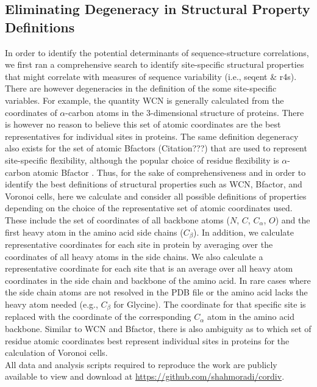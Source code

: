 \documentclass[12pt]{article}
\begin{document}
    \subsection*{Eliminating Degeneracy in Structural Property Definitions}
    In order to identify the potential determinants of sequence-structure correlations, we first ran a comprehensive search to identify site-specific structural properties that might correlate with measures of sequence variability (i.e., seqent \& r4s). There are however degeneracies in the definition of the some site-specific variables. For example, the quantity WCN is generally calculated from the coordinates of $\alpha$-carbon atoms in the 3-dimensional structure of proteins. There is however no reason to believe this set of atomic coordinates are the best representatives for individual sites in proteins. The same definition degeneracy also exists for the set of atomic Bfactors {\color{red}(Citation???)} that are used to represent site-specific flexibility, although the popular choice of residue flexibility is $\alpha$-carbon atomic Bfactor \citep{Halle2002}. Thus, for the sake of comprehensiveness and in order to identify the best definitions of structural properties such as WCN, Bfactor, and Voronoi cells, here we calculate and consider all possible definitions of properties depending on the choice of the representative set of atomic coordinates used. These include the set of coordinates of all backbone atoms ($N$, $C$, $C_\alpha$, $O$) and the first heavy atom in the amino acid side chains ($C_\beta$). In addition, we calculate representative coordinates for each site in protein by averaging over the coordinates of all heavy atoms in the side chains. We also calculate a representative coordinate for each site that is an average over all heavy atom coordinates in the side chain and backbone of the amino acid. In rare cases where the side chain atoms are not resolved in the PDB file or the amino acid lacks the heavy atom needed (e.g., $C_\beta$ for Glycine). The coordinate for that specific site is replaced with the coordinate of the corresponding $C_\alpha$ atom in the amino acid backbone. Similar to WCN and Bfactor, there is also ambiguity as to which set of residue atomic coordinates best represent individual sites in proteins for the calculation of Voronoi cells.\\


All data and analysis scripts required to reproduce the work are publicly available to view and download at \url{https://github.com/shahmoradi/cordiv}.
\end{document}
